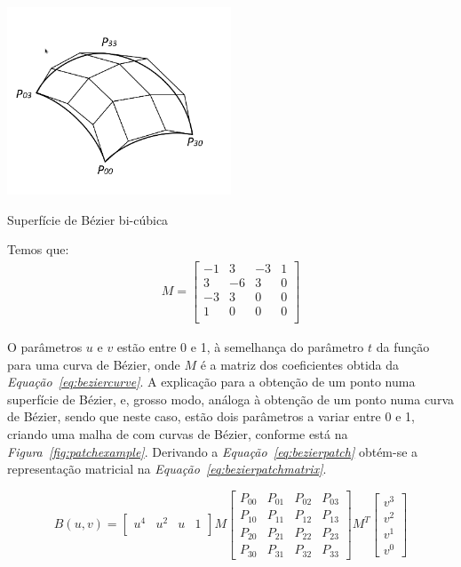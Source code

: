 \begin{center}
 	
 	\includegraphics[width=0.5\textwidth,height=0.5\textheight,keepaspectratio]{resources/beziersupf.png}
 	\captionsetup{type=figure, width=0.8\linewidth}
	\caption{Superfície de Bézier bi-cúbica}
\label{fig:patchexample} 
\end{center}
Temos que:
\begin{gather*}
M = \begin{bmatrix}
-1 &  3 & -3 & 1  \\
 3 & -6 & 3  & 0  \\
-3 &  3 & 0  & 0  \\
1  &  0 & 0  & 0  \\
\end{bmatrix}
\end{gather*}

O parâmetros $u$ e $v$ estão entre 0 e 1, à semelhança do parâmetro $t$ da
função para uma curva de Bézier, onde $M$ é a matriz dos coeficientes obtida da
\emph{Equação~\ref{eq:beziercurve}}. A explicação para a obtenção de um ponto
numa superfície de Bézier, e, grosso modo, análoga à obtenção de um ponto numa
curva de Bézier, sendo que neste caso, estão dois parâmetros a variar entre
0 e 1, criando uma malha de com curvas de Bézier, conforme está na
\emph{Figura~\ref{fig:patchexample}}. Derivando
a \emph{Equação~\ref{eq:bezierpatch}} obtém-se
a representação matricial na \emph{Equação~\ref{eq:bezierpatchmatrix}}.

\begin{equation}
B(u,v) = \begin{bmatrix}
       u^{4} & u^{2} & u & 1          \\
		\end{bmatrix}
		M\begin{bmatrix}
		       P_{00} & P_{01} & P_{02} & P_{03}   \\
		       P_{10} & P_{11} & P_{12} & P_{13}   \\
		       P_{20} & P_{21} & P_{22} & P_{23}   \\
		       P_{30} & P_{31} & P_{32} & P_{33}
		     \end{bmatrix}
		M^{T} \begin{bmatrix}
		       v^{3} \\
		       v^{2} \\
		       v^{1} \\
		       v^{0}
		     \end{bmatrix}
\label{eq:bezierpatchmatrix}				 
\end{equation}

